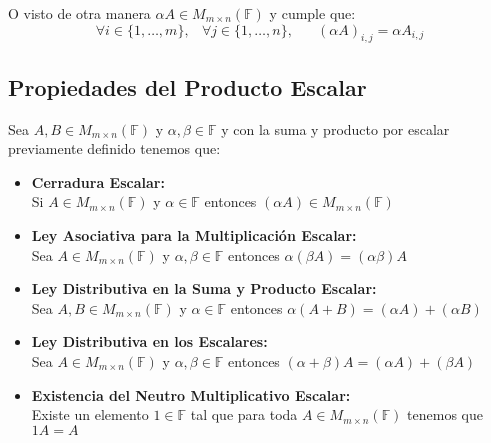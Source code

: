 \documentclass[12pt, fleqn]{report}                             %
\DeclareMathOperator \Space {\quad}                             %
\DeclareMathOperator \MiniSpace {\;}                            %
\begin{document}
            O visto de otra manera $\alpha A \in M_{m \times n}(\mathbb{F})$ y cumple que:
            \begin{equation}
                \forall i \in \{1, \dots, m\} ,\MiniSpace
                    \forall j \in \{1, \dots, n\} ,\Space
                        (\alpha A)_{i, j} = \alpha A_{i, j}
            \end{equation}

            \subsection{Propiedades del Producto Escalar}

                Sea $A, B \in M_{m \times n}(\mathbb{F})$ y $\alpha, \beta \in \mathbb{F}$
                y con la suma y producto por escalar previamente definido tenemos que:

                \begin{itemize}

                    \item \textbf{Cerradura Escalar:}\\
                        Si $A\in M_{m \times n}(\mathbb{F})$ y $\alpha \in \mathbb{F}$ entonces 
                        $(\alpha A) \in M_{m \times n}(\mathbb{F})$

                    \item \textbf{Ley Asociativa para la Multiplicación Escalar:}\\
                        Sea $A \in M_{m \times n}(\mathbb{F})$ y $\alpha, \beta \in \mathbb{F}$
                        entonces $\alpha(\beta A) = (\alpha \beta)A$

                    \item \textbf{Ley Distributiva en la Suma y Producto Escalar:}\\
                        Sea $A, B \in M_{m \times n}(\mathbb{F})$ y $\alpha \in \mathbb{F}$
                        entonces $\alpha(A + B) = (\alpha A) + (\alpha B)$

                    \item \textbf{Ley Distributiva en los Escalares:}\\
                        Sea $A \in M_{m \times n}(\mathbb{F})$ y $\alpha, \beta \in \mathbb{F}$
                        entonces $(\alpha + \beta)A = (\alpha A) + (\beta A)$

                    \item \textbf{Existencia del Neutro Multiplicativo Escalar:}\\
                        Existe un elemento $1 \in \mathbb{F}$ tal que para toda
                            $A \in M_{m \times n}(\mathbb{F})$ tenemos que $1A = A$

                \end{itemize}
\end{document}
